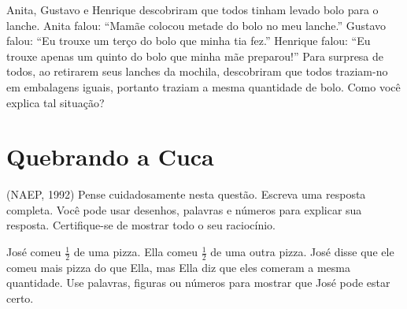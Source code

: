 \begin{atividade}{}\label{chap2-ativ12}

Anita, Gustavo e Henrique descobriram que todos tinham levado bolo para o lanche.\newline
Anita falou: ``Mamãe colocou metade do bolo no meu lanche.''\newline
Gustavo falou: ``Eu trouxe um terço do bolo que minha tia fez.''\newline
Henrique falou: ``Eu trouxe apenas um quinto do bolo que minha mãe preparou!''\newline
Para surpresa de todos, ao retirarem seus lanches da mochila, descobriram que todos traziam-no em  embalagens iguais, portanto traziam a mesma \linebreak quantidade de bolo.\newline
Como você explica tal situação?
\end{atividade}

\section{Quebrando a Cuca}


\begin{atividade}{}\label{chap2-ativ13}

(NAEP, 1992) Pense cuidadosamente nesta questão. Escreva uma resposta completa. Você pode usar desenhos, palavras e números para explicar sua resposta. Certifique-se de mostrar todo o seu raciocínio.

José comeu $\frac{1}{2}$ de uma pizza. Ella comeu $\frac{1}{2}$ de uma outra pizza. José disse que ele comeu mais pizza do que Ella, mas Ella diz que eles comeram a mesma quantidade. Use palavras, figuras ou números para mostrar que José pode estar certo.
\end{atividade}

